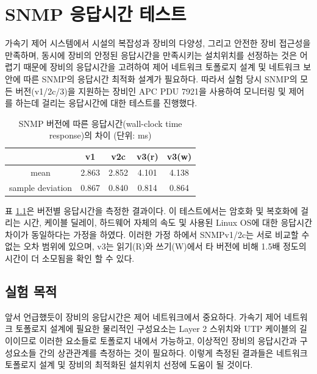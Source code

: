 \documentclass[11pt
  , a4paper
  , article
  , oneside
]{memoir}
\begin{document}
\clearpage

\chapter{SNMP 응답시간 테스트}

가속기 제어 시스템에서 시설의 복잡성과 장비의 다양성, 그리고 안전한 장비 접근성을 만족하며, 동시에 장비의 안정된 응답시간을 만족시키는 설치위치를 선정하는 것은 어렵기 때문에 장비의 응답시간을 고려하여 제어 네트워크 토폴로지 설계 및 네트워크 보안에 따른 SNMP의 응답시간 최적화 설계가 필요하다. 따라서 실험 당시 SNMP의 모든 버전(v1/2c/3)을 지원하는 장비인 APC PDU 7921을 사용하여 모니터링 및 제어를 하는데 걸리는 응답시간에 대한 테스트를 진행했다.

\begin{table}[h!]
\begin{center}
\begin{tabular}{c|c|c|c|c}\hline
 & v1 & v2c & v3(r) & v3(w) \\ \hline
mean & 2.863 & 2.852 & 4.101 & 4.138 \\ \hline
sample deviation & 0.867 & 0.840 & 0.814 & 0.864 \\ \hline
\end{tabular}
\caption{SNMP 버전에 따른 응답시간(wall-clock time response)의 차이 (단위: ms)}
  \label{table:test}  
\end{center}
\end{table}

표 \ref{table:test}은 버전별 응답시간을 측정한 결과이다. 이 테스트에서는 암호화 및 복호화에 걸리는 시간, 케이블 딜레이, 하드웨어 자체의 속도 및 사용된 Linux OS에 대한 응답시간 차이가 동일하다는 가정을 하였다. 이러한 가정 하에서 SNMPv1/2c는 서로 비교할 수 없는 오차 범위에 있으며, v3는 읽기(R)와 쓰기(W)에서 타 버전에 비해 1.5배 정도의 시간이 더 소모됨을 확인 할 수 있다.

\section{실험 목적}
앞서 언급했듯이 장비의 응답시간은 제어 네트워크에서 중요하다. 가속기 제어 네트워크 토폴로지 설계에 필요한 물리적인 구성요소는 Layer 2 스위치와 UTP 케이블의 길이이므로 이러한 요소들로 토폴로지 내에서 가능하고, 이상적인 장비의 응답시간과 구성요소들 간의 상관관계를 측정하는 것이 필요하다. 이렇게 측정된 결과들은 네트워크 토폴로지 설계 및 장비의 최적화된 설치위치 선정에 도움이 될 것이다.
\end{document}
